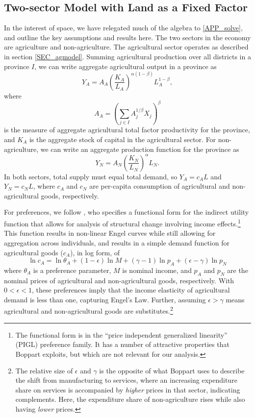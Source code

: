 \documentclass[11pt]{article}
\begin{document}
\subsection{Two-sector Model with Land as a Fixed Factor}\label{SEC_model}
In the interest of space, we have relegated much of the algebra to \ref{APP_solve}, and outline the key assumptions and results here. The two sectors in the economy are agriculture and non-agriculture. The agricultural sector operates as described in section \ref{SEC_agmodel}. Summing agricultural production over all districts in a province $I$, we can write aggregate agricultural output in a province as
\begin{equation}
    Y_A = A_A \left(\frac{K_A}{L_A}\right)^{\alpha(1-\beta)} L_A^{1-\beta}, \label{EQ_caL_solve}
\end{equation}
where 
\begin{equation}
    A_A = \left(\sum_{j\in I} A_{j}^{1/\beta}X_{j} \right)^\beta \nonumber
\end{equation}
is the measure of aggregate agricultural total factor productivity for the province, and $K_A$ is the aggregate stock of capital in the agricultural sector. For non-agriculture, we can write an aggregate production function for the province as
\begin{equation}
    Y_N = A_N \left(\frac{K_N}{L_N}\right)^{\alpha} L_N. \label{EQ_YN}
\end{equation}
In both sectors, total supply must equal total demand, so $Y_A = c_A L$ and $Y_N = c_N L$, where $c_A$ and $c_N$ are per-capita consumption of agricultural and non-agricultural goods, respectively.

For preferences, we follow \cite{boppart2014}, who specifies a functional form for the indirect utility function that allows for analysis of structural change involving income effects.\footnote{The functional form is in the ``price independent generalized linearity'' (PIGL) preference family. It has a number of attractive properties that Boppart exploits, but which are not relevant for our analysis.} This function results in non-linear Engel curves while still allowing for aggregation across individuals, and results in a simple demand function for agricultural goods ($c_A$), in log form, of
\begin{equation}
    \ln c_A = \ln \theta_A + (1-\epsilon) \ln M + (\gamma - 1) \ln p_A + (\epsilon - \gamma) \ln p_N \label{EQ_ca_demand}
\end{equation}
where $\theta_A$ is a preference parameter, $M$ is nominal income, and $p_A$ and $p_N$ are the nominal prices of agricultural and non-agricultural goods, respectively. With $0 < \epsilon < 1$, these preferences imply that the income elasticity of agricultural demand is less than one, capturing Engel's Law. Further, assuming $\epsilon > \gamma$ means agricultural and non-agricultural goods are substitutes.\footnote{The relative size of $\epsilon$ and $\gamma$ is the opposite of what Boppart uses to describe the shift from manufacturing to services, where an increasing expenditure share on services is accompanied by \textit{higher} prices in that sector, indicating complements. Here, the expenditure share of non-agriculture rises while also having \textit{lower} prices.}
\end{document}

